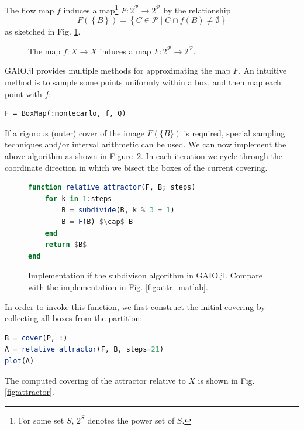 \documentclass{juliacon}
\newcommand{\cP}{\mathcal{P}}
\begin{document}
The flow map $f$ induces a map\footnote{For some set $S$, $2^S$ denotes the power set of $S$.} $F : 2^\cP \to 2^\cP$ by the relationship 
\begin{equation}
    F \left( \left\{ B \right\} \right) = 
    \left\{ C \in \cP \mid C \cap f(B) \neq \emptyset \right\}
\end{equation}
%
as sketched in Fig. \ref{fig:boxcover}. 
%
\begin{figure}[h]
    \centering
    
    \caption{The map $f:X\to X$ induces a map $F : 2^\cP \to 2^\cP$.}
    \label{fig:boxcover}
\end{figure}
%
GAIO.jl provides multiple methods for approximating the map $F$. An intuitive method is to sample some points  uniformly within a box, and then map each point with $f$:  
\begin{lstlisting}[backgroundcolor=\color{gray10}]
F = BoxMap(:montecarlo, f, Q)
\end{lstlisting}
If a rigorous (outer) cover of the image $F(\{B\})$ is required, special sampling techniques \cite{rigoroussampling} and/or interval arithmetic can be used.
We can now implement the above algorithm as shown in Figure~\ref{fig:attr_julia}.  In each iteration we cycle through the coordinate direction in which we bisect the boxes of the current covering.
\begin{figure}[h]
\begin{lstlisting}[language=Julia,backgroundcolor=\color{gray10},mathescape]
function relative_attractor(F, B; steps)
    for k in 1:steps
        B = subdivide(B, k % 3 + 1)
        B = F(B) $\cap$ B
    end
    return $B$
end
\end{lstlisting}
\caption{Implementation if the subdivison algorithm in GAIO.jl. Compare with the implementation in Fig. \ref{fig:attr_matlab}.}
\label{fig:attr_julia}
\end{figure}

In order to invoke this function, we first construct the initial covering by collecting all boxes from the partition:
\begin{lstlisting}[language=Julia,mathescape,backgroundcolor=\color{gray10}]
B = cover(P, :)
A = relative_attractor(F, B, steps=21)
plot(A)
\end{lstlisting}

The computed covering of the attractor relative to $X$ is shown in Fig. \ref{fig:attractor}.  
\end{document}

